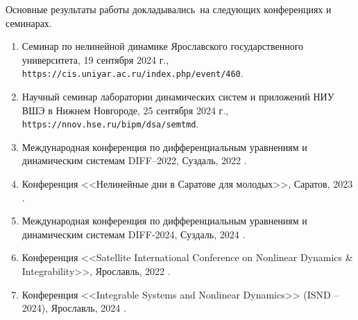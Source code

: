 {\probation}
Основные результаты работы докладывались~на следующих конференциях и семинарах.
\begin{enumerate}
	\item Семинар по нелинейной динамике Ярославского государственного университета, 19 сентября 2024 г.,\\\texttt{https://cis.uniyar.ac.ru/index.php/event/460}.
	\item Научный семинар лаборатории динамических систем и приложений НИУ ВШЭ в Нижнем Новгороде, 25 сентября 2024 г.,\\\texttt{https://nnov.hse.ru/bipm/dsa/semtmd}.
	\item Международная конференция по дифференциальным уравнениям и динамическим системам DIFF--2022, Суздаль, 2022  \cite{confbib1}.
	\item Конференция <<Нелинейные дни в Саратове для молодых>>, Саратов, 2023 \cite{confbib2}.
	\item Международная конференция по дифференциальным уравнениям и динамическим системам DIFF-2024, Суздаль, 2024 \cite{confbib3}.
	\item Конференция <<Satellite International Conference on Nonlinear Dynamics {\&} Integrability>>, Ярославль, 2022 \cite{confbib4}.
	\item Конференция <<Integrable Systems and Nonlinear Dynamics>> (ISND – 2024), Ярославль, 2024 \cite{confbib5}.
\end{enumerate}


\vspace{-11em}

